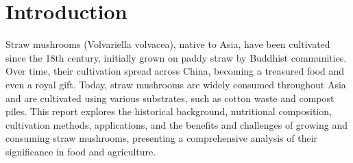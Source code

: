 \chapter{Introduction}

\fontsize{16pt}{16pt}\normalfont
Straw mushrooms (Volvariella volvacea), native to Asia, have been cultivated since the 18th century, initially grown on paddy straw by Buddhist communities. Over time, their cultivation spread across China, becoming a treasured food and even a royal gift. Today, straw mushrooms are widely consumed throughout Asia and are cultivated using various substrates, such as cotton waste and compost piles.
\medbreak
This report explores the historical background, nutritional composition, cultivation methods, applications, and the benefits and challenges of growing and consuming straw mushrooms, presenting a comprehensive analysis of their significance in food and agriculture.
